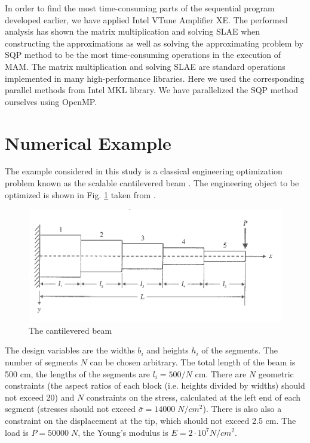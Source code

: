 \documentclass[runningheads,a4paper]{llncs}
\begin{document}
In order to find the most time-consuming parts of the sequential program developed earlier, we have applied Intel VTune Amplifier XE. The performed analysis has shown the matrix multiplication and solving SLAE when constructing the approximations as well as solving the approximating problem by SQP method to be the most time-consuming operations in the execution of MAM. The matrix multiplication and solving SLAE are standard operations implemented in many high-performance libraries. Here we used the corresponding parallel methods from Intel MKL library. We have parallelized the SQP method ourselves using OpenMP.

\section{Numerical Example}
\label{sec:num_example}

The example considered in this study is a classical engineering optimization problem known as the scalable cantilevered beam \cite{Vanderpllaats2001}. The engineering object to be optimized is shown in Fig. \ref{fig:beam} taken from \cite{Vanderpllaats2001}.

\begin{figure}[ht]
    \centering
    \includegraphics[width=1.0\textwidth]{beam.png}
    \caption{The cantilevered beam}
    \label{fig:beam}
\end{figure}

The design variables are the widths $b_i$ and heights $h_i$ of the segments. The number of segments $N$ can be chosen arbitrary. The total length of the beam is 500 cm, the lengths of the segments are $l_i=500/N$  cm. There are $N$ geometric constraints (the aspect ratios of each block (i.e. heights divided by widths) should not exceed 20) and $N$ constraints on the stress, calculated at the left end of each segment (stresses should not exceed  $\bar{\sigma}=14000\; N/cm^2$). There is also also a constraint on the displacement at the tip, which should not exceed 2.5 cm. The load is $P = 50 000\; N$, the Young's modulus is $E=2\cdot 10^7  N/cm^2$.
\end{document}
